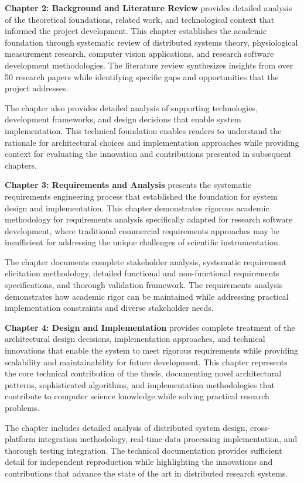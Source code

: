 \documentclass[11pt,a4paper]{article}
\begin{document}
\textbf{Chapter 2: Background and Literature Review} provides detailed analysis of the theoretical foundations, related
work, and technological context that informed the project development.  This chapter
establishes the academic foundation
through systematic review of distributed systems theory, physiological measurement
research, computer vision
applications, and research software development methodologies.  The literature review
synthesizes insights from over 50
research papers while identifying specific gaps and opportunities that the project
addresses.

The chapter also provides detailed analysis of supporting technologies, development
frameworks, and design decisions
that enable system implementation.  This technical foundation enables readers to
understand the rationale for
architectural choices and implementation approaches while providing context for
evaluating the innovation and
contributions presented in subsequent chapters.

\textbf{Chapter 3: Requirements and Analysis} presents the systematic requirements engineering process that established the
foundation for system design and implementation.  This chapter demonstrates rigorous
academic methodology for
requirements analysis specifically adapted for research software development, where
traditional commercial requirements
approaches may be insufficient for addressing the unique challenges of scientific
instrumentation.

The chapter documents complete stakeholder analysis, systematic requirement
elicitation methodology, detailed
functional and non-functional requirements specifications, and thorough validation
framework.  The requirements
analysis demonstrates how academic rigor can be maintained while addressing practical
implementation constraints and
diverse stakeholder needs.

\textbf{Chapter 4: Design and Implementation} provides complete treatment of the architectural design decisions,
implementation approaches, and technical innovations that enable the system to meet
rigorous requirements while
providing scalability and maintainability for future development.  This chapter
represents the core technical
contribution of the thesis, documenting novel architectural patterns, sophisticated
algorithms, and implementation
methodologies that contribute to computer science knowledge while solving practical
research problems.

The chapter includes detailed analysis of distributed system design, cross-platform
integration methodology, real-time
data processing implementation, and thorough testing integration.  The technical
documentation provides sufficient
detail for independent reproduction while highlighting the innovations and
contributions that advance the state of the
art in distributed research systems.
\end{document}
